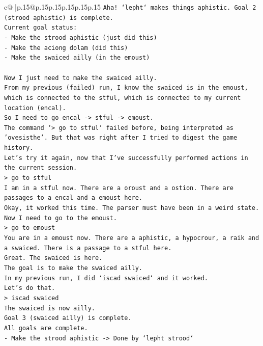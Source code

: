 \documentclass{article}
\begin{document}
{\begin{supertabular}{c@{$\;$}|p{.15\linewidth}@{}p{.15\linewidth}p{.15\linewidth}p{.15\linewidth}p{.15\linewidth}p{.15\linewidth}}
{{{\texttt{Aha! `lepht` makes things aphistic. Goal 2 (strood aphistic) is complete.} \\
\texttt{Current goal status:} \\
\texttt{{-} Make the strood aphistic (just did this)} \\
\texttt{{-} Make the aciong dolam (did this)} \\
\texttt{{-} Make the swaiced ailly (in the emoust)} \\
\\ 
\texttt{Now I just need to make the swaiced ailly.} \\
\texttt{From my previous (failed) run, I know the swaiced is in the emoust, which is connected to the stful, which is connected to my current location (encal).} \\
\texttt{So I need to go encal {-}> stful {-}> emoust.} \\
\texttt{The command `> go to stful` failed before, being interpreted as 'ovesisthe'. But that was right after I tried to digest the game history.} \\
\texttt{Let's try it again, now that I've successfully performed actions in the current session.} \\
\texttt{> go to stful} \\
\texttt{I am in a stful now. There are a oroust and a ostion. There are passages to a encal and a emoust here.} \\
\texttt{Okay, it worked this time. The parser must have been in a weird state.} \\
\texttt{Now I need to go to the emoust.} \\
\texttt{> go to emoust} \\
\texttt{You are in a emoust now. There are a aphistic, a hypocrour, a raik and a swaiced. There is a passage to a stful here.} \\
\texttt{Great. The swaiced is here.} \\
\texttt{The goal is to make the swaiced ailly.} \\
\texttt{In my previous run, I did `iscad swaiced` and it worked.} \\
\texttt{Let's do that.} \\
\texttt{> iscad swaiced} \\
\texttt{The swaiced is now ailly.} \\
\texttt{Goal 3 (swaiced ailly) is complete.} \\
\texttt{All goals are complete.} \\
\texttt{{-} Make the strood aphistic {-}> Done by `lepht strood`} \\
}}}
\end{supertabular}}
\end{document}
